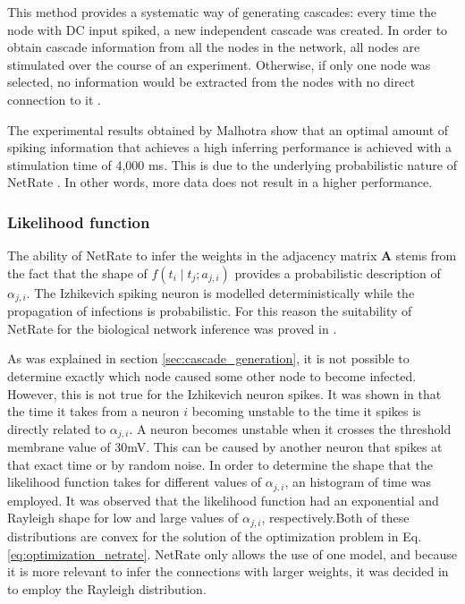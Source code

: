 \documentclass[11pt]{article}
\begin{document}
This method provides a systematic way of generating cascades: every time the node with DC input spiked, a new independent cascade was created. In order to obtain cascade information from all the nodes in the network, all nodes are stimulated over the course of an experiment. Otherwise, if only one node was selected, no information would be extracted from the nodes with no direct connection to it \cite{pranav_report}. 

The experimental results obtained by Malhotra show that an optimal amount of spiking information that achieves a high inferring performance is achieved with a stimulation time of 4,000 ms. This is due to the underlying probabilistic nature of NetRate \cite{pranav_report}. In other words, more data does not result in a higher performance.

\subsubsection{Likelihood function}

The ability of NetRate to infer the weights in the adjacency matrix \textbf{A} stems from the fact that the shape of $f(t_{i}\mid t_{j};a_{j,i})$ provides a probabilistic description of $\alpha_{j,i}$. The Izhikevich spiking neuron is modelled deterministically while the propagation of infections is probabilistic. For this reason the suitability of NetRate for the biological network inference was proved in \cite{alexandru2018estimating}.

As was explained in section \ref{sec:cascade_generation}, it is not possible to determine exactly which node caused some other node to become infected. However, this is not true for the Izhikevich neuron spikes. It was shown in \cite{alexandru2018estimating} that the time it takes from a neuron $i$ becoming unstable to the time it spikes is directly related to $\alpha_{j,i}$. A neuron becomes unstable when it crosses the threshold membrane value of 30mV. This can be caused by another neuron that spikes at that exact time or by random noise. In order to determine the shape that the likelihood function takes for different values of $\alpha_{j,i}$, an histogram of time was employed. It was observed that the likelihood function had an exponential and Rayleigh shape for low and large values of $\alpha_{j,i}$, respectively.Both of these distributions are convex for the solution of the optimization problem in Eq.\ref{eq:optimization_netrate}. NetRate only allows the use of one model, and because it is more relevant to infer the connections with larger weights, it was decided in \cite{alexandru2018estimating} to employ the Rayleigh distribution. 
\end{document}
